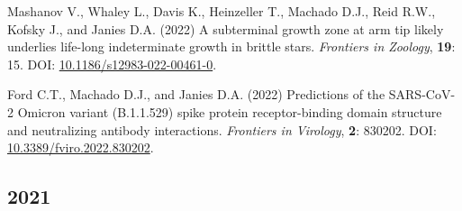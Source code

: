 \documentclass[11pt, letterpaper, sans]{moderncv}
\begin{document}
    {\setlength{\parskip}{.5em}\renewcommand{\baselinestretch}{2.0}\begin{hangparas}{.25in}{1}

    	Mashanov V., Whaley L., Davis K., Heinzeller T., Machado D.J., Reid R.W., Kofsky J., and Janies D.A. (2022) A subterminal growth zone at arm tip likely underlies life-long indeterminate growth in brittle stars. \textit{Frontiers in Zoology}, \textbf{19}: 15. DOI: \href{https://doi.org/10.1186/s12983-022-00461-0}{10.1186/s12983-022-00461-0}.

    	Ford C.T., Machado D.J., and Janies D.A. (2022) Predictions of the SARS-CoV-2 Omicron variant (B.1.1.529) spike protein receptor-binding domain structure and neutralizing antibody interactions. \textit{Frontiers in Virology}, \textbf{2}: 830202. DOI: \href{https://doi.org/10.3389/fviro.2022.830202}{10.3389/fviro.2022.830202}.

    \end{hangparas}}


\subsection{2021}
\end{document}
